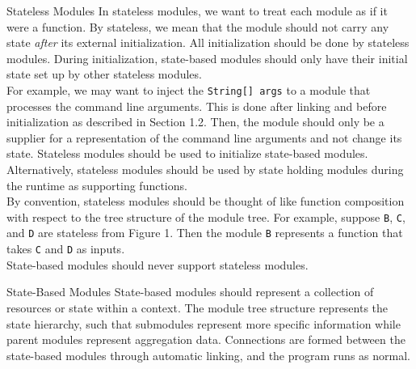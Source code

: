 \documentclass[11pt]{article}
\begin{document}
\begin{section}{Stateless Modules}
In stateless modules, we want to treat each module as if it were a function. By stateless, we mean that the module should not carry any state \emph{after} its external initialization. All initialization should be done by stateless modules. During initialization, state-based modules should only have their initial state set up by other stateless modules. \\

For example, we may want to inject the \verb|String[] args| to a module that processes the command line arguments. This is done after linking and before initialization as described in Section 1.2. Then, the module should only be a supplier for a representation of the command line arguments and not change its state. Stateless modules should be used to initialize state-based modules. Alternatively, stateless modules should be used by state holding modules during the runtime as supporting functions.\\

By convention, stateless modules should be thought of like function composition with respect to the tree structure of the module tree. For example, suppose \verb|B|, \verb|C|, and \verb|D| are stateless from Figure 1. Then the module \verb|B| represents a function that takes \verb|C| and \verb|D| as inputs. \\

State-based modules should never support stateless modules.\\
\end{section}

\begin{section}{State-Based Modules}
State-based modules should represent a collection of resources or state within a context. The module tree structure represents the state hierarchy, such that submodules represent more specific information while parent modules represent aggregation data. Connections are formed between the state-based modules through automatic linking, and the program runs as normal.
\end{section}
\end{document}
